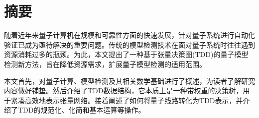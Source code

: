 \intobmk\chapter*{摘\quad 要}%
\setcounter{page}{1}%




随着近年来量子计算机在规模和可靠性方面的快速发展，针对量子系统进行自动化验证已成为亟待解决的重要问题。传统的模型检测技术在面对量子系统时往往遇到资源消耗过多的瓶颈。为此，本文提出了一种基于张量决策图(TDD)的量子模型检测新方法，旨在降低资源需求，扩展量子模型检测的适用范围。

本文首先，对量子计算、模型检测及其相关数学基础进行了概述，为读者了解研究内容做好铺垫。然后介绍了TDD数据结构，它本质上是一种带权重的决策树，用于紧凑高效地表示张量网络。接着阐述了如何将量子线路转化为TDD表示，并介绍了TDD的规范化、化简和基本运算等操作。

